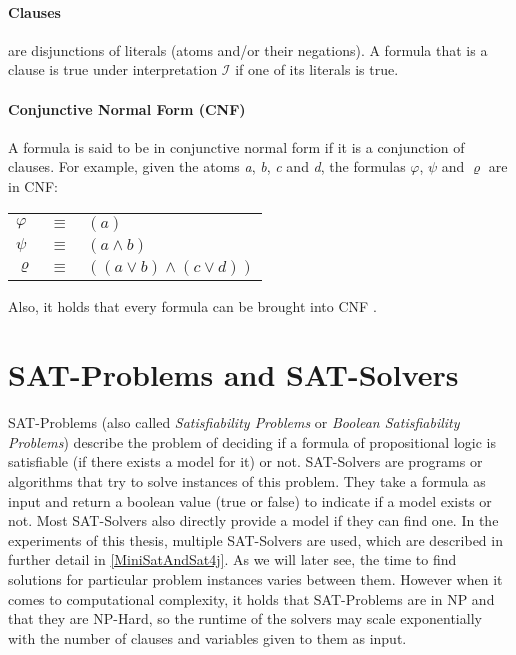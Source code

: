 \paragraph{Clauses}
are disjunctions of literals (atoms and/or their negations). A formula that is a clause is true under interpretation $\mathcal{I}$ if one of its literals is true.

\paragraph{Conjunctive Normal Form (CNF)}
A formula is said to be in conjunctive normal form if it is a conjunction of clauses. 
For example, given the atoms \emph{a}, \emph{b}, \emph{c} and \emph{d}, the formulas $\varphi$, $\psi$ and $\varrho$ are in CNF:
\begin{center}
    \begin{tabular}{ l l l }
    $\varphi$ & $\equiv$ & $(a)$\\
    $\psi$ & $\equiv$ & $(a \land b)$\\
    $\varrho$ & $\equiv$ & $((a \lor b) \land (c \lor d))$\\
\end{tabular}
\end{center}
Also, it holds that every formula can be brought into CNF \cite{LogicForComputerScientists}.


\newpage
\section{SAT-Problems and SAT-Solvers}
SAT-Problems (also called \emph{Satisfiability Problems} or \emph{Boolean Satisfiability Problems}) describe the problem of deciding if a formula of propositional logic is satisfiable (if there exists a model for it) or not. SAT-Solvers are programs or algorithms that try to solve instances of this problem. They take a formula as input and return a boolean value (true or false) to indicate if a model exists or not. Most SAT-Solvers also directly provide a model if they can find one. In the experiments of this thesis, multiple SAT-Solvers are used, which are described in further detail in \ref{MiniSatAndSat4j}. As we will later see, the time to find solutions for particular problem instances varies between them. However when it comes to computational complexity, it holds that SAT-Problems are in NP and that they are NP-Hard\cite{10.1145/800157.805047}\cite{levin1973universal}, so the runtime of the solvers may scale exponentially with the number of clauses and variables given to them as input.


